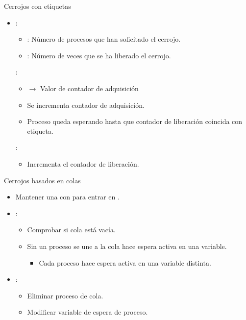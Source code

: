 \begin{frame}[t]{Cerrojos con etiquetas}
\begin{itemize}
  \item {}:
    \begin{itemize}
      \item {}: Número de procesos que han solicitado el cerrojo.
      \item {}: Número de veces que se ha liberado el cerrojo.
    \end{itemize}

  :
    \begin{itemize}
      \item {} $\rightarrow$ Valor de contador de adquisición
      \item Se incrementa contador de adquisición.
      \item Proceso queda esperando hasta que contador de liberación coincida con etiqueta.
    \end{itemize}

  :
    \begin{itemize}
      \item Incrementa el contador de liberación.
    \end{itemize}
\end{itemize}
\end{frame}


\begin{frame}[t]{Cerrojos basados en colas}
\begin{itemize}
  \item Mantener una  con  
        para entrar en .

  \item {}:
    \begin{itemize}
      \item Comprobar si cola está vacía.
      \item Sin un proceso se une a la cola hace espera activa en una variable.
      \begin{itemize}
        \item Cada proceso hace espera activa en una variable distinta.
      \end{itemize}
    \end{itemize}

  \item {}:
    \begin{itemize}
      \item Eliminar proceso de cola.
      \item Modificar variable de espera de proceso.
    \end{itemize}

\end{itemize}
\end{frame}
